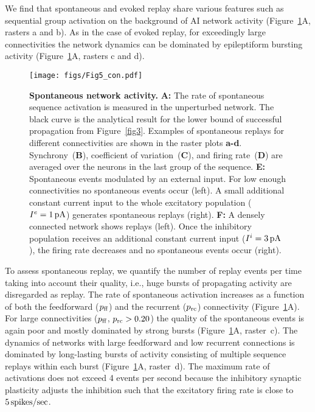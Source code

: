     We find that spontaneous and evoked replay share various features such as
    sequential group activation on the background of AI network activity
    (Figure~\ref{fig5}A, rasters a and b). As in the case of evoked replay, for
    exceedingly large connectivities the network dynamics can be dominated by
    epileptiform bursting activity (Figure~\ref{fig5}A, rasters c and d).

    \begin{figure}[!h]
      \texttt{[image: figs/Fig5\_con.pdf]}
      \caption{{\bf Spontaneous network activity.}
        \textbf{A:} The rate of spontaneous sequence activation is measured in
        the unperturbed network.  The black curve is the analytical result for
        the lower bound of successful propagation from Figure~\ref{fig3}.  Examples
        of spontaneous replays for different connectivities are shown in the
        raster plots \textbf{a-d}.
        Synchrony~(\textbf{B}), coefficient of variation~(\textbf{C}), and firing
        rate~(\textbf{D}) are averaged over the neurons in the last group of the
        sequence.
        \textbf{E:} Spontaneous events modulated by an external input.  For low
        enough connectivities no spontaneous events occur (left). A small
        additional constant current input to the whole excitatory population
        ($I^e=1\,\rm pA$) generates spontaneous replays (right).
        \textbf{F:} A densely connected network shows replays (left). Once the
        inhibitory population receives an additional constant current input
        ($I^i=3\,\rm pA$), the firing rate decreases and no spontaneous events
        occur (right).
      }
      \label{fig5}
    \end{figure}

    To assess spontaneous replay, we quantify the number of replay events per
    time taking into account their quality, i.e., huge bursts of propagating
    activity are disregarded as replay. The rate of spontaneous activation
    increases as a function of both the feedforward ($p_{\rm ff}$) and the
    recurrent ($p_{\rm rc}$) connectivity (Figure~\ref{fig5}A). For large
    connectivities ($p_{\rm ff}$, $p_{\rm rc}> 0.20$) the quality of the
    spontaneous events is again poor and mostly dominated by strong bursts
    (Figure~\ref{fig5}A, raster~c). The dynamics of networks with large
    feedforward and low recurrent connections is dominated by long-lasting
    bursts of activity consisting of multiple sequence replays within each
    burst (Figure~\ref{fig5}A, raster~d). The maximum rate of activations does not
    exceed 4 events per second because the inhibitory synaptic plasticity
    adjusts the inhibition such that the excitatory firing rate is close to $5
    \, \rm spikes/sec$.

